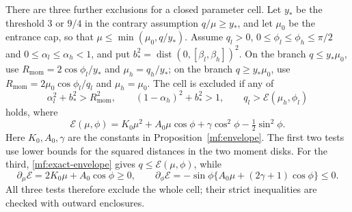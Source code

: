 \documentclass[11pt,reqno]{amsart}
\numberwithin{equation}{section}
\theoremstyle{definition}
\theoremstyle{remark}
\begin{document}
There are three further exclusions for a closed parameter cell.
Let $y_*$ be the threshold $3$ or $9/4$ in the contrary assumption
$q/\mu\ge y_*$, and let $\mu_0$ be the entrance cap, so that
$\mu\le\min(\mu_0,q/y_*)$.
Assume $q_l>0$, $0\le\phi_l\le\phi_h\le\pi/2$ and
$0\le\alpha_l\le\alpha_h<1$, and put
$b_*^2=\operatorname{dist}(0,[\beta_l,\beta_h])^2$.
On the branch $q\le y_*\mu_0$, use
$R_{\mathrm{mom}}=2\cos\phi_l/y_*$ and $\mu_h=q_h/y_*$;
on the branch $q\ge y_*\mu_0$, use
$R_{\mathrm{mom}}=2\mu_0\cos\phi_l/q_l$ and $\mu_h=\mu_0$.
The cell is excluded if any of
\begin{equation}\label{mf:cell-exclusions}
 \alpha_l^2+b_*^2>R_{\mathrm{mom}}^2,\qquad
 (1-\alpha_h)^2+b_*^2>1,\qquad
 q_l>\mathcal E(\mu_h,\phi_l)
\end{equation}
holds, where
\[
 \mathcal E(\mu,\phi)
 =K_0\mu^2+A_0\mu\cos\phi
       +\gamma\cos^2\phi-\tfrac12\sin^2\phi.
\]
Here $K_0,A_0,\gamma$ are the constants in Proposition~\ref{mf:envelope}.
The first two tests use lower bounds for the squared distances in
the two moment disks. For the third, \eqref{mf:exact-envelope} gives
$q\le\mathcal E(\mu,\phi)$, while
\[
 \partial_\mu\mathcal E=2K_0\mu+A_0\cos\phi\ge0,\qquad
 \partial_\phi\mathcal E
 =-\sin\phi\{A_0\mu+(2\gamma+1)\cos\phi\}\le0.
\]
All three tests therefore exclude the whole cell; their strict
inequalities are checked with outward enclosures.
\end{document}
